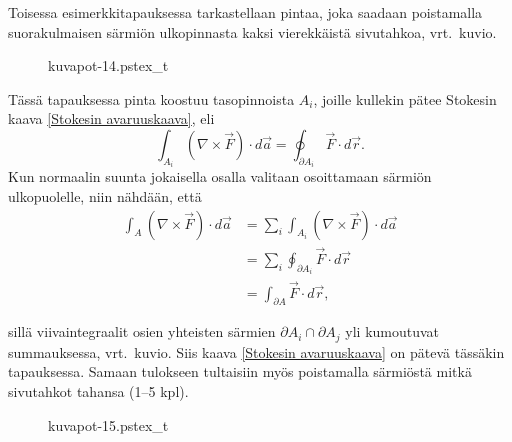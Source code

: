 \begin{Exa} Toisessa esimerkkitapauksessa tarkastellaan pintaa, joka saadaan poistamalla
suorakulmaisen särmiön ulkopinnasta kaksi vierekkäistä sivutahkoa, vrt.\ kuvio.
\begin{figure}[H]
\begin{center}
{kuvapot-14.pstex_t}
\end{center}
\end{figure}
Tässä tapauksessa pinta koostuu tasopinnoista $A_i$, joille kullekin pätee Stokesin kaava
\eqref{Stokesin avaruuskaava}, eli
\[
\int_{A_i} (\nabla\times\vec F)\cdot d\vec a=\oint_{\partial A_i} \vec F\cdot d\vec r.
\]
Kun normaalin suunta jokaisella osalla valitaan osoittamaan särmiön ulkopuolelle, niin nähdään,
että
\begin{align*}
\int_A (\nabla\times\vec F)\cdot d\vec a 
&= \sum_{i} \int_{A_i} (\nabla\times\vec F)\cdot d\vec a \\
&= \sum_i \oint_{\partial A_i} \vec F\cdot d\vec r \\
&= \int_{\partial A} \vec F\cdot d\vec r,
\end{align*}
\begin{multicols}{2} \raggedcolumns
\parbox{5cm}{sillä viivaintegraalit osien yhteisten särmien $\partial A_i\cap\partial A_j$ yli
kumoutuvat summauksessa, vrt.\ kuvio. Siis kaava \eqref{Stokesin avaruuskaava} on
pätevä tässäkin tapauksessa. Samaan tulokseen tultaisiin myös poistamalla särmiöstä mitkä
sivutahkot tahansa (1--5 kpl). \loppu}
\begin{figure}[H]
\begin{center}
{kuvapot-15.pstex_t}
\end{center}
\end{figure}
\end{multicols}
\end{Exa}
